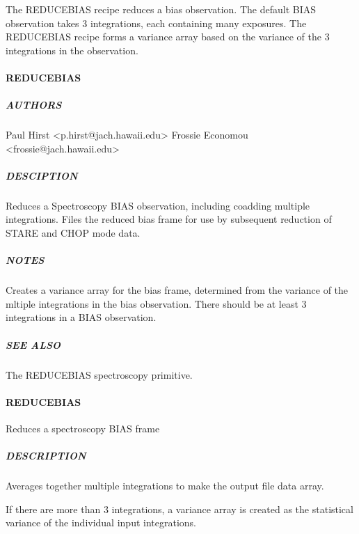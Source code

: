 \documentclass[twoside,11pt]{article}
\renewcommand{\_}{\texttt{\symbol{95}}}
\begin{document}
The REDUCE\_BIAS recipe reduces a bias observation. The default BIAS
observation takes 3 integrations, each containing many exposures. The
REDUCE\_BIAS recipe forms a variance array based on the variance of the
3 integrations in the observation.


\paragraph*{REDUCE\_BIAS\label{REDUCE_BIAS}}



\subparagraph*{AUTHORS\label{REDUCE_BIAS_AUTHORS}}

Paul Hirst <p.hirst@jach.hawaii.edu>
Frossie Economou <frossie@jach.hawaii.edu>

\subparagraph*{DESCIPTION\label{REDUCE_BIAS_DESCIPTION}}

Reduces a Spectroscopy BIAS observation, including coadding multiple
integrations. Files the reduced bias frame for use by subsequent
reduction of STARE and CHOP mode data.

\subparagraph*{NOTES\label{REDUCE_BIAS_NOTES}}

Creates a variance array for the bias frame, determined from the 
variance of the mltiple integrations in the bias observation. There
should be at least 3 integrations in a BIAS observation.

\subparagraph*{SEE ALSO\label{REDUCE_BIAS_SEE_ALSO}}

The \_REDUCE\_BIAS\_ spectroscopy primitive.


\paragraph*{\_REDUCE\_BIAS\_\label{_REDUCE_BIAS_}}

Reduces a spectroscopy BIAS frame

\subparagraph*{DESCRIPTION\label{_REDUCE_BIAS__DESCRIPTION}}

Averages together multiple integrations to make the output file data array.



If there are more than 3 integrations, a variance array is created as the
statistical variance of the individual input integrations.
\end{document}
